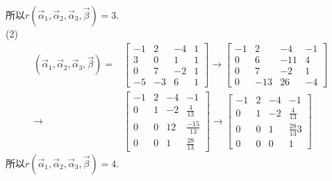 所以$r(\vec{\alpha}_1, \vec{\alpha}_2,\vec{\alpha}_3,\vec{\beta})=3$.\\
(2)\begin{displaymath}\begin{aligned}(\vec{\alpha}_1, \vec{\alpha}_2,\vec{\alpha}_3,\vec{\beta})=&\begin{bmatrix}-1&2&-4&1\\ 3&0&1&1\\ 0&7&-2&1\\-5&-3&6&1\end{bmatrix}
\rightarrow \begin{bmatrix}-1&2&-4&-1\\ 0&6&-11&4\\ 0&7&-2&1\\0&-13&26&-4\end{bmatrix}\\
\rightarrow &\begin{bmatrix}-1&2&-4&-1\\ 0&1&-2&\frac{4}{13}\\ 0&0&12&\frac{-15}{13}\\0&0&1&\frac{28}{13}\end{bmatrix}
\rightarrow \begin{bmatrix}-1&2&-4&-1\\ 0&1&-2&\frac{4}{13}\\ 0&0&1&\frac{28}{13}3\\0&0&0&1\end{bmatrix}\end{aligned}\end{displaymath}
所以$r(\vec{\alpha}_1, \vec{\alpha}_2,\vec{\alpha}_3,\vec{\beta})=4$.

